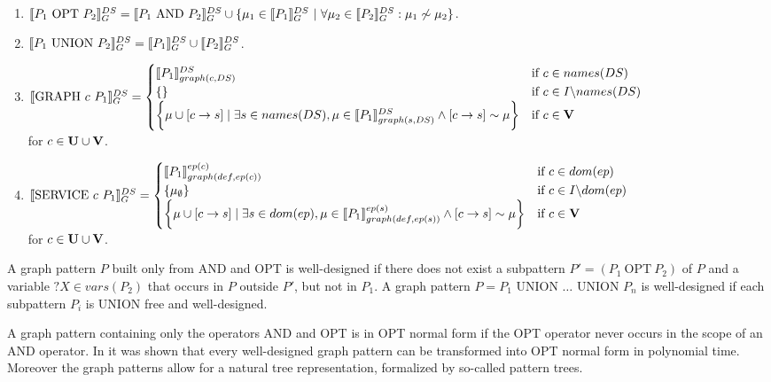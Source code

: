 \begin{definition}
{{\begin{enumerate}
				\item $\llbracket P_1 \ \mbox{OPT} \ P_2 \rrbracket_G^{DS} = \llbracket P_1 \ \mbox{AND} \ P_2 \rrbracket_G^{DS}
					\cup \{ \mu_1 \in \llbracket P_1
					\rrbracket_G^{DS} \ | \ \forall \mu_2 \in \llbracket P_2 \rrbracket_G^{DS}: \mu_1 \not\sim \mu_2\}$.
				\item $\llbracket P_1 \ \mbox{UNION} \ P_2 \rrbracket_G^{DS} = \llbracket P_1 \rrbracket_G^{DS} \cup \llbracket P_2
					\rrbracket_G^{DS}$.
				\item  $\llbracket \mbox{GRAPH } c \ P_1 \rrbracket_G^{DS}  = \begin{cases} 
						\llbracket P_1\rrbracket_{graph(c,DS)}^{DS} &\mbox{if } c \in names(DS)\\	
						\{ \} & \mbox{if } c \in I \backslash names(DS)\\
						\bigg\{\mu \cup [c \rightarrow s ] \mid \exists s \in names(DS), \mu
							\in \llbracket P_1 \rrbracket^{DS}_{graph(s,DS)} \land [ c \rightarrow s ] \sim \mu
						\bigg\} & \mbox{if } c \in \mathbf{V}
						\end{cases}$\\ for $c \in \mathbf{U} \cup \mathbf{V}$.

					\item  $\llbracket \mbox{SERVICE } c \ P_1 \rrbracket_G^{DS}  = \begin{cases} 
							\llbracket P_1\rrbracket_{graph(def,ep(c))}^{ep(c)} &\mbox{if } c \in dom(ep)\\	
							\{ \mu_\emptyset\} & \mbox{if } c \in I \backslash dom(ep)\\
							\bigg\{\mu \cup [c \rightarrow s ] \mid  \exists s \in dom(ep), \mu
								\in \llbracket P_1 \rrbracket^{ep(s)}_{graph(def,ep(s))} \land [ c \rightarrow s ] \sim \mu
							\bigg\} & \mbox{if } c \in \mathbf{V}
							\end{cases}$\\ for $c \in \mathbf{U} \cup \mathbf{V}$.
					\end{enumerate}
				}
			}
		\end{definition}

			\begin{definition}
				A graph pattern $P$ built only from AND and OPT is well-designed if there does
				not exist a subpattern $P' = (P_1 \  \mbox{OPT} \ P_2)$ of $P$ and a variable $?X \in
				vars(P_2)$ that occurs in $P$ outside $P'$, but not in $P_1$. A graph pattern $P
				= P_1 \mbox{ UNION } \dots \mbox{ UNION } P_n$ is well-designed if each subpattern $P_i$ is UNION
				free and well-designed.
			\end{definition}

			\begin{definition}
				A graph pattern containing only the operators AND and OPT is in OPT normal form
				if the OPT operator never occurs in the scope of an AND operator. In
				\cite{letelier2013static} it was shown that every well-designed graph pattern
				can be transformed into OPT normal form in polynomial time. Moreover the graph
				patterns allow for a natural tree representation, formalized by so-called
				pattern trees.
			\end{definition}


